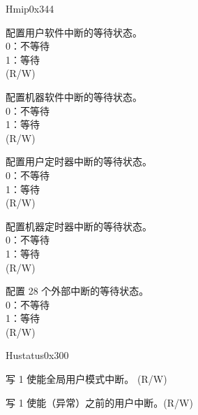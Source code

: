 \begin{register}{H}{mip}{0x344}\label{regdesc:MIP}
%
%
%
%
%
%
%
\regnewline%
\begin{regdesc}\begin{reglist}
\label{fielddesc:MIPUSIP}\item [USIP] 配置用户软件中断的等待状态。\\
0：不等待\\
1：等待\\
(R/W)
\label{fielddesc:MIPMSIP}\item [MSIP] 配置机器软件中断的等待状态。 \\
0：不等待\\
1：等待\\
(R/W)
\label{fielddesc:MIPUTIP}\item [UTIP] 配置用户定时器中断的等待状态。 \\
0：不等待\\
1：等待\\
(R/W)
\label{fielddesc:MIPMTIP}\item [MTIP] 配置机器定时器中断的等待状态。 \\
0：不等待\\
1：等待\\
(R/W)
\label{fielddesc:MIPMXIP}\item [MXIP] 配置 28 个外部中断的等待状态。 \\
0：不等待\\
1：等待\\
(R/W)
\end{reglist}\end{regdesc}
\end{register}

\begin{register}{H}{ustatus}{0x300}\label{regdesc:USTATUS}
%
%
%
%
\regnewline%
\begin{regdesc}\begin{reglist}
\label{fielddesc:USTATUSUIE}\item [UIE] 写 1 使能全局用户模式中断。 (R/W)
\label{fielddesc:USTATUSUPIE}\item [UPIE] 写 1 使能（异常）之前的用户中断。(R/W)
\end{reglist}\end{regdesc}
\end{register}

